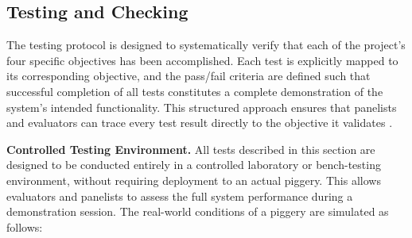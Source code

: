 \subsection{Testing and Checking}
The testing protocol is designed to systematically verify that each of the project's four specific objectives has been accomplished. Each test is explicitly mapped to its corresponding objective, and the pass/fail criteria are defined such that successful completion of all tests constitutes a complete demonstration of the system's intended functionality. This structured approach ensures that panelists and evaluators can trace every test result directly to the objective it validates \cite{adeoye2025animalia,dingcong2017monitoring,beyondtech2025smart}.

\textbf{Controlled Testing Environment.}
All tests described in this section are designed to be conducted entirely in a controlled laboratory or bench-testing environment, without requiring deployment to an actual piggery. This allows evaluators and panelists to assess the full system performance during a demonstration session. The real-world conditions of a piggery are simulated as follows:

